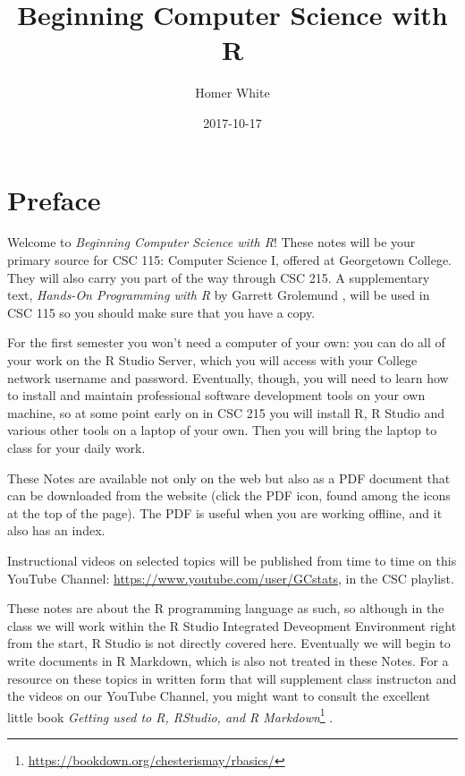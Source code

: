 \documentclass[]{book}
\title{Beginning Computer Science with R}
\author{Homer White}
\date{2017-10-17}
\let\rmarkdownfootnote\footnote%
\def\footnote{\protect\rmarkdownfootnote}
\renewcommand{\href}[2]{#2\footnote{\url{#1}}}
\renewcommand{\href}[2]{#2\footnote{\url{#1}}}
\theoremstyle{definition}
\theoremstyle{definition}
\theoremstyle{definition}
\theoremstyle{remark}
\begin{document}
\maketitle

{
\setcounter{tocdepth}{1}
\tableofcontents
}
\chapter*{Preface}\label{preface}

Welcome to \emph{Beginning Computer Science with R}! These notes will be
your primary source for CSC 115: Computer Science I, offered at
Georgetown College. They will also carry you part of the way through CSC
215. A supplementary text, \emph{Hands-On Programming with R} by Garrett
Grolemund \citep{Grolemund2014}, will be used in CSC 115 so you should
make sure that you have a copy.

For the first semester you won't need a computer of your own: you can do
all of your work on the R Studio Server, which you will access with your
College network username and password. Eventually, though, you will need
to learn how to install and maintain professional software development
tools on your own machine, so at some point early on in CSC 215 you will
install R, R Studio and various other tools on a laptop of your own.
Then you will bring the laptop to class for your daily work.

These Notes are available not only on the web but also as a PDF document
that can be downloaded from the website (click the PDF icon, found among
the icons at the top of the page). The PDF is useful when you are
working offline, and it also has an index.

Instructional videos on selected topics will be published from time to
time on this YouTube Channel:
\url{https://www.youtube.com/user/GCstats}, in the CSC playlist.

These notes are about the R programming language as such, so although in
the class we will work within the R Studio Integrated Deveopment
Environment right from the start, R Studio is not directly covered here.
Eventually we will begin to write documents in R Markdown, which is also
not treated in these Notes. For a resource on these topics in written
form that will supplement class instructon and the videos on our YouTube
Channel, you might want to consult the excellent little book
\href{https://bookdown.org/chesterismay/rbasics/}{\emph{Getting used to
R, RStudio, and R Markdown}} \citep{Ismay2016}.
\end{document}
